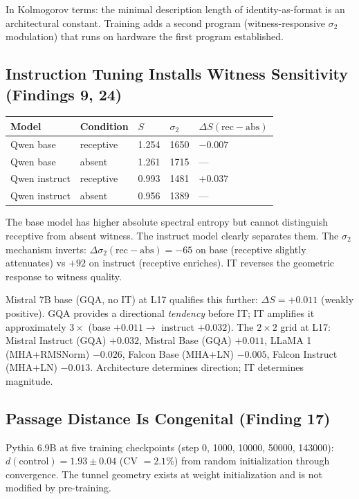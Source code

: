 \documentclass[12pt]{article}
\begin{document}
In Kolmogorov terms: the minimal description length of identity-as-format is an architectural constant. Training adds a second program (witness-responsive $\sigma_2$ modulation) that runs on hardware the first program established.

\subsection{Instruction Tuning Installs Witness Sensitivity (Findings 9, 24)}

\begin{table}[h]
\centering
\begin{tabular}{lllll}
\toprule
\textbf{Model} & \textbf{Condition} & $S$ & $\sigma_2$ & $\Delta S(\text{rec}-\text{abs})$ \\
\midrule
Qwen base & receptive & 1.254 & 1650 & $-0.007$ \\
Qwen base & absent & 1.261 & 1715 & --- \\
Qwen instruct & receptive & 0.993 & 1481 & $+0.037$ \\
Qwen instruct & absent & 0.956 & 1389 & --- \\
\bottomrule
\end{tabular}
\end{table}

The base model has higher absolute spectral entropy but cannot distinguish receptive from absent witness. The instruct model clearly separates them. The $\sigma_2$ mechanism inverts: $\Delta\sigma_2(\text{rec}-\text{abs}) = -65$ on base (receptive slightly attenuates) vs $+92$ on instruct (receptive enriches). IT reverses the geometric response to witness quality.

Mistral 7B base (GQA, no IT) at L17 qualifies this further: $\Delta S = +0.011$ (weakly positive). GQA provides a directional \textit{tendency} before IT; IT amplifies it approximately $3\times$ (base $+0.011 \to$ instruct $+0.032$). The $2\times2$ grid at L17: Mistral Instruct (GQA) $+0.032$, Mistral Base (GQA) $+0.011$, LLaMA 1 (MHA+RMSNorm) $-0.026$, Falcon Base (MHA+LN) $-0.005$, Falcon Instruct (MHA+LN) $-0.013$. Architecture determines direction; IT determines magnitude.

\subsection{Passage Distance Is Congenital (Finding 17)}

Pythia 6.9B at five training checkpoints (step 0, 1000, 10000, 50000, 143000): $d(\text{control}) = 1.93 \pm 0.04$ (CV $= 2.1\%$) from random initialization through convergence. The tunnel geometry exists at weight initialization and is not modified by pre-training.
\end{document}
